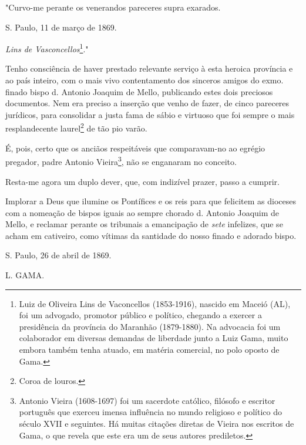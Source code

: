 "Curvo-me perante os venerandos pareceres supra exarados.

S. Paulo, 11 de março de 1869.

\emph{Lins de Vasconcellos}\footnote{Luiz de Oliveira Lins de
  Vaconcellos (1853-1916), nascido em Maceió (AL), foi um advogado,
  promotor público e político, chegando a exercer a presidência da
  província do Maranhão (1879-1880). Na advocacia foi um colaborador em
  diversas demandas de liberdade junto a Luiz Gama, muito embora também
  tenha atuado, em matéria comercial, no polo oposto de Gama.}."

Tenho consciência de haver prestado relevante serviço à esta heroica
província e ao país inteiro, com o mais vivo contentamento dos sinceros
amigos do exmo. finado bispo d. Antonio Joaquim de Mello, publicando
estes dois preciosos documentos. Nem era preciso a inserção que venho de
fazer, de cinco pareceres jurídicos, para consolidar a justa fama de
sábio e virtuoso que foi sempre o mais resplandecente laurel\footnote{
  Coroa de louros.} de tão pio varão.

É, pois, certo que os anciãos respeitáveis que comparavam-no ao egrégio
pregador, padre Antonio Vieira\footnote{Antonio Vieira (1608-1697) foi
  um sacerdote católico, filósofo e escritor português que exerceu
  imensa influência no mundo religioso e político do século XVII e
  seguintes. Há muitas citações diretas de Vieira nos escritos de Gama,
  o que revela que este era um de seus autores prediletos.},
não se enganaram no conceito.

Resta-me agora um duplo dever, que, com indizível prazer, passo a
cumprir.

Implorar a Deus que ilumine os Pontífices e os reis para que felicitem
as dioceses com a nomeação de bispos iguais ao sempre chorado d. Antonio
Joaquim de Mello, e reclamar perante os tribunais a emancipação de
\emph{sete} infelizes, que se acham em cativeiro, como vítimas da
santidade do nosso finado e adorado bispo.

S. Paulo, 26 de abril de 1869.

L. GAMA.

\pagebreak
\mbox{}\vfill
\thispagestyle{empty}

